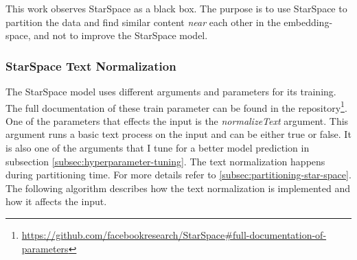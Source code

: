 This work observes StarSpace as a black box. The purpose is to use StarSpace to partition the data and find similar content \emph{near} each other in the embedding-space, and not to improve the StarSpace model.

\subsubsection{StarSpace Text Normalization}
\label{subsubsec:star-space-text-normalization}
The StarSpace model uses different arguments and parameters for its training. The full documentation of these train parameter can be found in the repository\footnote{\url{https://github.com/facebookresearch/StarSpace\#full-documentation-of-parameters}}. One of the parameters that effects the input is the \emph{normalizeText} argument. This argument runs a basic text process on the input and can be either true or false. It is also one of the arguments that I tune for a better model prediction in subsection \ref{subsec:hyperparameter-tuning}. The text normalization happens during partitioning time. For more details refer to \ref{subsec:partitioning-star-space}. The following algorithm describes how the text normalization is implemented and how it affects the input.

